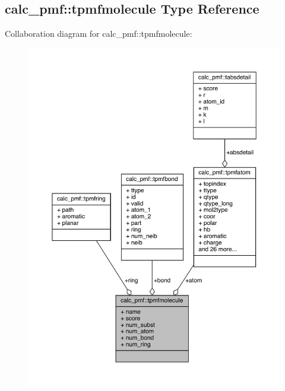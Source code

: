 \hypertarget{structcalc__pmf_1_1tpmfmolecule}{\subsection{calc\-\_\-pmf\-:\-:tpmfmolecule Type Reference}
\label{structcalc__pmf_1_1tpmfmolecule}
}


Collaboration diagram for calc\-\_\-pmf\-:\-:tpmfmolecule\-:
\nopagebreak
\begin{figure}[H]
\begin{center}
\leavevmode
\includegraphics[width=350pt]{structcalc__pmf_1_1tpmfmolecule__coll__graph}
\end{center}
\end{figure}
